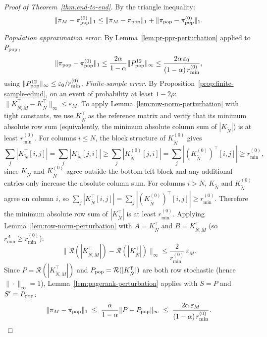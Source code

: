 \documentclass{article}
\theoremstyle{plain}
\theoremstyle{definition}
\newcommand{\norm}[1]{\| #1 \|}
\def\tp{\intercal}
\newcommand{\arXivtag}[1][]{#1}
\begin{document}
\begin{proof}[Proof of Theorem~\ref{thm:end-to-end}]
	By the triangle inequality:
	\begin{equation*}
		\norm{{\pi}_M - \pi_{\textnormal{pop}}^{(0)}}_1 \leq \norm{{\pi}_M - \pi_{\textnormal{pop}}}_1 + \norm{\pi_{\textnormal{pop}} - \pi_{\textnormal{pop}}^{(0)}}_1.\arXivtag
	\end{equation*}
	
	\textit{Population approximation error.} By Lemma~\ref{lem:pr-ppr-perturbation} applied to $P_{\textnormal{pop}}$,
		\begin{equation}\label{eq:pop-error}
			\|\pi_{\textnormal{pop}} - \pi_{\textnormal{pop}}^{(0)}\|_1 \leq \frac{2\alpha}{1-\alpha}\|P^{12}_{\textnormal{pop}}\|_\infty \leq \frac{2\alpha\,\varepsilon_0}{(1-\alpha)\,r^{(0)}_{\min}},
		\end{equation}
		using $\|P^{12}_{\textnormal{pop}}\|_\infty \leq \varepsilon_0/r^{(0)}_{\min}$.
	\textit{Finite-sample error.} By Proposition~\ref{prop:finite-sample-edmd}, on an event of probability at least $1-2\rho$: $\norm{K_{\tilde{N},M}^\tp - K_{\tilde{N}}^\tp}_\infty \leq \varepsilon_M.$ 
	To apply Lemma~\ref{lem:row-norm-perturbation} with tight constants, we use $K_{\tilde{N}}^\tp$ as the reference matrix and verify that its minimum absolute row sum (equivalently, the minimum absolute column sum of $|K_{\tilde{N}}|$) is at least $r^{(0)}_{\min}$. For columns $i \leq N$, the block structure of $K_{\tilde{N}}^{(0)}$ gives
	\[
	\sum_j |K_{\tilde{N}}^\tp[i,j]| = \sum_j |K_{\tilde{N}}[j,i]| \geq \sum_j |K_{\tilde{N}}^{(0)}[j,i]| = \sum_j |(K_{\tilde{N}}^{(0)})^\tp[i,j]| \geq r^{(0)}_{\min},
	\]
	since $K_{\tilde{N}}$ and $K_{\tilde{N}}^{(0)}$ agree outside the bottom-left block and any additional entries only increase the absolute column sum. For columns $i > N$, $K_{\tilde{N}}$ and $K_{\tilde{N}}^{(0)}$ agree on column $i$, so $\sum_j |K_{\tilde{N}}^\tp[i,j]| = \sum_j |(K_{\tilde{N}}^{(0)})^\tp[i,j]| \geq r^{(0)}_{\min}$.
	Therefore the minimum absolute row sum of $|K_{\tilde{N}}^\tp|$ is at least $r^{(0)}_{\min}$. Applying Lemma~\ref{lem:row-norm-perturbation} with $A = K_{\tilde{N}}^\tp$ and $B = K_{\tilde{N},M}^\tp$ (so $r_{\min}^A \geq r^{(0)}_{\min}$):
	\[
	\|\mathcal{R}(|K_{\tilde{N},M}^\tp|) - \mathcal{R}(|K_{\tilde{N}}^\tp|)\|_\infty
	\leq \frac{2}{r^{(0)}_{\min}}\,\varepsilon_M.
	\]
	Since \arXivtag[$P = \mathcal{R}(|K_{\tilde{N},M}^\tp|)$ and $P_{\textnormal{pop}} = \mathcal{R}(|K_{\tilde{N}}^\tp|)$] are both row stochastic (hence $\|\cdot\|_\infty = 1$), Lemma~\ref{lem:pagerank-perturbation} applies with \arXivtag[$S = P$ and $S' = P_{\textnormal{pop}}$]:
	\begin{equation}\label{eq:sample-error}
		\|{\pi}_M - \pi_{\textnormal{pop}}\|_1 \;\leq\; \frac{\alpha}{1-\alpha}\|P - P_{\textnormal{pop}}\|_\infty
		\;\leq\; \frac{2\alpha\,\varepsilon_M}{(1-\alpha)\,r^{(0)}_{\min}}.
	\end{equation}
	

\end{proof}
\end{document}
